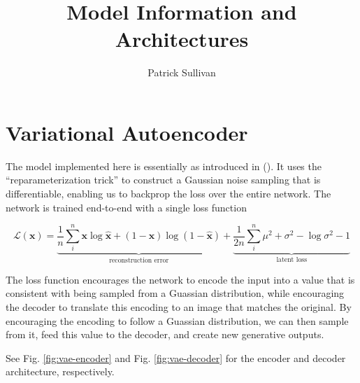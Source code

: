\documentclass[twoside,11pt,a4paper]{article}
\title{Model Information and Architectures}
\author{Patrick Sullivan}
\begin{document}
\maketitle

\section{Variational Autoencoder}

The model implemented here is essentially as introduced in (\cite{kingma2013auto}). It uses the ``reparameterization trick'' to construct a
Gaussian noise sampling that is differentiable, enabling us to backprop the loss over the entire network. The network is trained
end-to-end with a single loss function

\begin{equation}
\mathcal{L}(\textbf{x}) =
\underbrace{\frac{1}{n} \sum_i^n \textbf{x} \log{\hat{\textbf{x}}} + (1-\textbf{x}) \log{(1-\hat{\textbf{x}})}}_{\text{reconstruction error}} +
\underbrace{\frac{1}{2n} \sum_i^n \mu^2 + \sigma^2 - \log{\sigma^2} - 1}_{\text{latent loss}}
\end{equation}

The loss function encourages the network to encode the input into a value that is consistent with being sampled from a Guassian distribution,
while encouraging the decoder to translate this encoding to an image that matches the original.
By encouraging the encoding to follow a Guassian distribution, we can then sample from it, feed this value to the decoder, and create new
generative outputs. 


See Fig. \ref{fig:vae-encoder} and Fig. \ref{fig:vae-decoder} for the encoder and decoder architecture, respectively.
\end{document}

